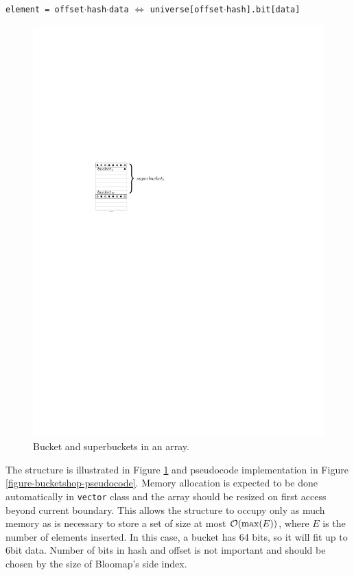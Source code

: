 \begin{center}
	{\tt element = offset$\cdot$hash$\cdot$data} $\Leftrightarrow$
	{\tt universe[offset$\cdot$hash].bit[data]}
\end{center}

\begin{figure}[h!]
	\centering\hspace{2.5cm}
	\includegraphics{img/bucketshop.pdf}
	\caption{Bucket and superbuckets in an array.}
	\label{figure-bucketshop}
\end{figure}

The structure is illustrated in Figure \ref{figure-bucketshop} and pseudocode
implementation in Figure \ref{figure-bucketshop-pseudocode}. Memory allocation
is expected to be done automatically in {\tt vector} class and the array should
be resized on first access beyond current boundary.  This allows the structure
to occupy only as much memory as is necessary to store a set of size at most
$\mathcal{O}(\max(E))$, where $E$ is the number of elements inserted. In this case, a
bucket has 64 bits, so it will fit up to 6bit data. Number of bits in hash and
offset is not important and should be chosen by the size of Bloomap's side
index.

